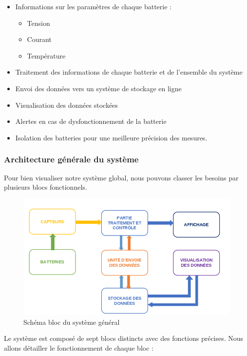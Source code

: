 \begin{itemize}
	\item Informations sur les paramètres de chaque batterie :
	\begin{itemize}
		\item Tension
		\item Courant
		\item Température
	\end{itemize}
	\item Traitement des informations de chaque batterie et de l'ensemble du système
	\item Envoi des données vers un système de stockage en ligne
	\item Visualisation des données stockées
	\item Alertes en cas de dysfonctionnement de la batterie
	\item Isolation des batteries pour une meilleure précision des mesures.
\end{itemize}

\subsubsection{Architecture générale du système}

Pour bien visualiser notre système global, nous pouvons classer les besoins par plusieurs blocs fonctionnels.

\begin{figure}[H]
	\centering
	\includegraphics[width=17cm]{./img/schemaBloc.png}
	\caption{Schéma bloc du système général}
	\label{i1}
\end{figure}

Le système est composé de sept blocs distincts avec des fonctions précises. Nous allons détailler le fonctionnement de chaque bloc :

